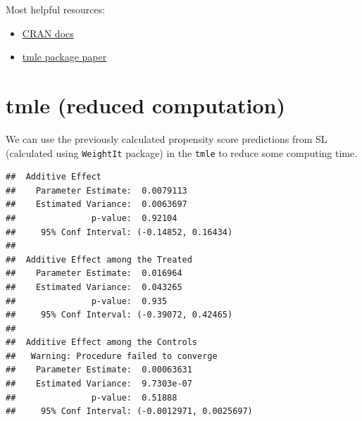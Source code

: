 \documentclass[
]{book}
\newenvironment{Shaded}{\begin{snugshade}}{\end{snugshade}}
\newcommand{\AttributeTok}[1]{\textcolor[rgb]{0.77,0.63,0.00}{#1}}
\newcommand{\DecValTok}[1]{\textcolor[rgb]{0.00,0.00,0.81}{#1}}
\newcommand{\FunctionTok}[1]{\textcolor[rgb]{0.00,0.00,0.00}{#1}}
\newcommand{\NormalTok}[1]{#1}
\newcommand{\OtherTok}[1]{\textcolor[rgb]{0.56,0.35,0.01}{#1}}
\newcommand{\SpecialCharTok}[1]{\textcolor[rgb]{0.00,0.00,0.00}{#1}}
\newcommand{\StringTok}[1]{\textcolor[rgb]{0.31,0.60,0.02}{#1}}
\providecommand{\tightlist}{%
  \setlength{\itemsep}{0pt}\setlength{\parskip}{0pt}}
\begin{document}
Most helpful resources:

\begin{itemize}
\tightlist
\item
  \href{https://cran.r-project.org/web/packages/tmle/tmle.pdf}{CRAN docs}
\item
  \href{https://www.jstatsoft.org/article/view/v051i13}{tmle package paper}
\end{itemize}

\hypertarget{tmle-reduced-computation}{%
\section{tmle (reduced computation)}\label{tmle-reduced-computation}}

We can use the previously calculated propensity score predictions from SL (calculated using \texttt{WeightIt} package) in the \texttt{tmle} to reduce some computing time.

\begin{Shaded}
\end{Shaded}

\begin{verbatim}
##  Additive Effect
##    Parameter Estimate:  0.0079113
##    Estimated Variance:  0.0063697
##               p-value:  0.92104
##     95% Conf Interval: (-0.14852, 0.16434) 
## 
##  Additive Effect among the Treated
##    Parameter Estimate:  0.016964
##    Estimated Variance:  0.043265
##               p-value:  0.935
##     95% Conf Interval: (-0.39072, 0.42465) 
## 
##  Additive Effect among the Controls
##   Warning: Procedure failed to converge
##    Parameter Estimate:  0.00063631
##    Estimated Variance:  9.7303e-07
##               p-value:  0.51888
##     95% Conf Interval: (-0.0012971, 0.0025697)
\end{verbatim}
\end{document}
